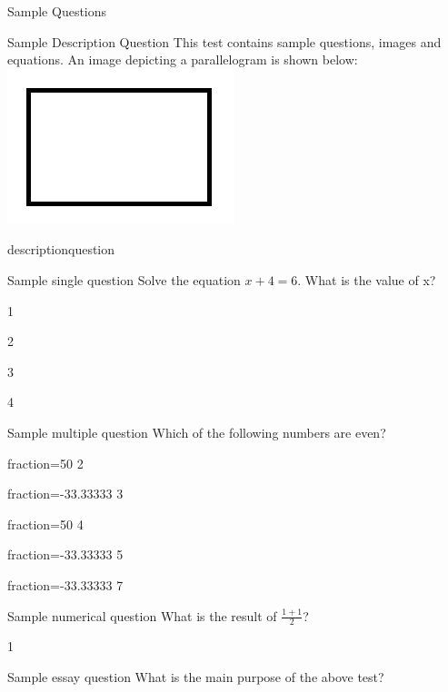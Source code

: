 \documentclass[12pt]{article}
\begin{document}
\begin{quiz}{Sample Questions}

\begin{shortanswer}[default grade=0.0000000, penalty=0.0000000]{Sample Description Question}
This test contains sample questions, images and equations. An image depicting a parallelogram is shown below:\\
\includegraphics{image.png}
\\[-2cm]\color{white}
\item descriptionquestion
\end{shortanswer}

\begin{multi}{Sample single question}
Solve the equation ${x + 4 = 6}$. What is the value of x?
\item 1
\item* 2
\item 3
\item 4
\end{multi}

\begin{multi}[multiple]{Sample multiple question}
Which of the following numbers are even?
\item[fraction=50] 2
\item[fraction=-33.33333] 3
\item[fraction=50] 4
\item[fraction=-33.33333] 5
\item[fraction=-33.33333] 7
\end{multi}

\begin{numerical}{Sample numerical question}
What is the result of ${\frac{1 + 1}{2}}$?
\item 1
\end{numerical}

\begin{essay}{Sample essay question}
What is the main purpose of the above test?
\end{essay}

\end{quiz}
\end{document}
